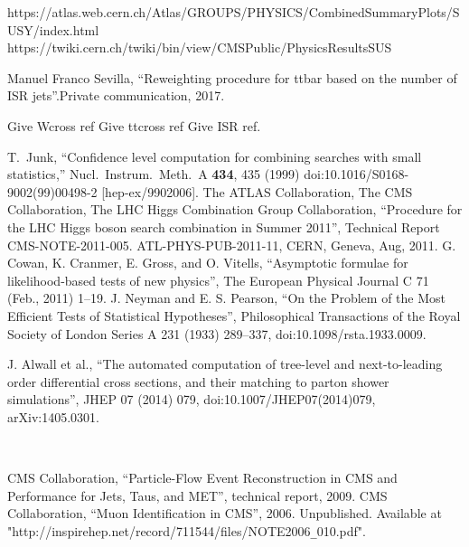 \begin{thebibliography}{9}
https://atlas.web.cern.ch/Atlas/GROUPS/PHYSICS/CombinedSummaryPlots/SUSY/index.html 
  https://twiki.cern.ch/twiki/bin/view/CMSPublic/PhysicsResultsSUS



Manuel Franco Sevilla, “Reweighting procedure for ttbar based on the number of ISR jets''.Private communication, 2017.


Give Wcross ref
Give ttcross ref
Give ISR ref.

  T.~Junk,
  ``Confidence level computation for combining searches with small statistics,''
  Nucl.\ Instrum.\ Meth.\ A {\bf 434}, 435 (1999)
  doi:10.1016/S0168-9002(99)00498-2
  [hep-ex/9902006].
The ATLAS Collaboration, The CMS Collaboration, The LHC Higgs Combination Group Collaboration, “Procedure for the LHC Higgs boson search combination in Summer 2011”, Technical Report CMS-NOTE-2011-005. ATL-PHYS-PUB-2011-11, CERN, Geneva, Aug, 2011.
G. Cowan, K. Cranmer, E. Gross, and O. Vitells, “Asymptotic formulae for likelihood-based tests of new physics”, The European Physical Journal C 71 (Feb., 2011) 1–19.
J. Neyman and E. S. Pearson, “On the Problem of the Most Efficient Tests of Statistical Hypotheses”, Philosophical Transactions of the Royal Society of London Series A 231 (1933) 289–337, doi:10.1098/rsta.1933.0009.





 

J. Alwall et al., “The automated computation of tree-level and next-to-leading order differential cross sections, and their matching to parton shower simulations”, JHEP 07 (2014) 079, doi:10.1007/JHEP07(2014)079, arXiv:1405.0301.

\


CMS Collaboration, “Particle-Flow Event Reconstruction in CMS and Performance for Jets, Taus, and MET”, technical report, 2009.
CMS Collaboration, “Muon Identification in CMS”, 2006. Unpublished. Available at "http://inspirehep.net/record/711544/files/NOTE2006\texttt{\_}010.pdf".


\end{thebibliography}
